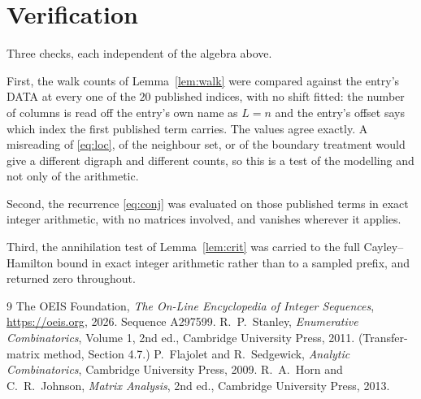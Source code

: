 \documentclass[11pt,a4paper]{article}
\theoremstyle{plain}
\theoremstyle{definition}
\begin{document}
\section{Verification}

Three checks, each independent of the algebra above.

First, the walk counts of Lemma~\ref{lem:walk} were compared against the entry's DATA at
every one of the $20$ published indices, with no shift fitted: the number of columns is
read off the entry's own name as $L=n$ and the entry's offset says which index the first
published term carries. The values agree exactly. A misreading of \eqref{eq:loc}, of the
neighbour set, or of the boundary treatment would give a different digraph and different
counts, so this is a test of the modelling and not only of the arithmetic.

Second, the recurrence \eqref{eq:conj} was evaluated on those published terms in exact
integer arithmetic, with no matrices involved, and vanishes wherever it applies.

Third, the annihilation test of Lemma~\ref{lem:crit} was carried to the full
Cayley--Hamilton bound in exact integer arithmetic rather than to a sampled prefix, and
returned zero throughout.

\begin{thebibliography}{9}
 The OEIS Foundation, \emph{The On-Line Encyclopedia of Integer
Sequences}, \url{https://oeis.org}, 2026. Sequence A297599.
 R.~P.~Stanley, \emph{Enumerative Combinatorics}, Volume 1, 2nd ed.,
Cambridge University Press, 2011. (Transfer-matrix method, Section 4.7.)
 P.~Flajolet and R.~Sedgewick, \emph{Analytic Combinatorics}, Cambridge
University Press, 2009.
 R.~A.~Horn and C.~R.~Johnson, \emph{Matrix Analysis}, 2nd ed., Cambridge
University Press, 2013.
\end{thebibliography}
\end{document}
